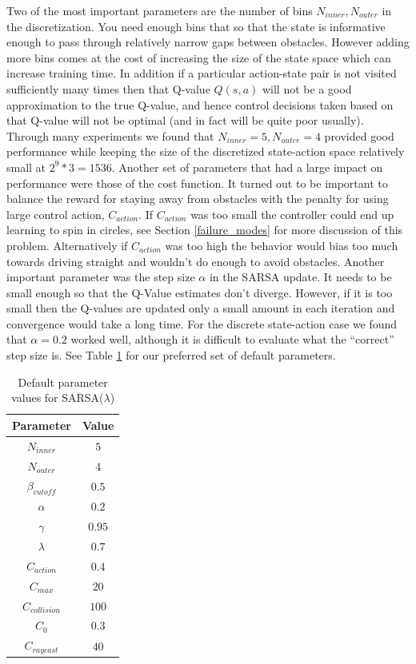 \documentclass{article}
\begin{document}
Two of the most important parameters are the number of bins $N_{inner}, N_{outer}$ in the discretization. You need enough bins that so that the state is informative enough to pass through relatively narrow gaps between obstacles. However adding more bins comes at the cost of increasing the size of the state space which can increase training time. In addition if a particular action-state pair is not visited sufficiently many times then that Q-value $Q(s,a)$ will not be a good approximation to the true Q-value, and hence control decisions taken based on that Q-value will not be optimal (and in fact will be quite poor usually). Through many experiments we found that $N_{inner} = 5, N_{outer} = 4$ provided good performance while keeping the size of the discretized state-action space relatively small at $2^9 * 3 = 1536$. Another set of parameters that had a large impact on performance were those of the cost function. It turned out to be important to balance the reward for staying away from obstacles with the penalty for using large control action, $C_{action}$. If $C_{action}$ was too small the controller could end up learning to spin in circles, see Section \ref{failure_modes} for more discussion of this problem. Alternatively if $C_{action}$ was too high the behavior would bias too much towards driving straight and wouldn't do enough to avoid obstacles. Another important parameter was the step size $\alpha$ in the SARSA update. It needs to be small enough so that the Q-Value estimates don't diverge. However, if it is too small then the Q-values are updated only a small amount in each iteration and convergence would take a long time. For the discrete state-action case we found that $\alpha = 0.2$ worked well, although it is difficult to evaluate what the ``correct'' step size is. See Table \ref{table:defaultParameters} for our preferred set of default parameters.
%
%
%
%
\begin{table}
\centering
\begin{tabular}{|c|c|}
\hline
Parameter & Value  \\ \hline
$N_{inner}$ & $5$ \\ \hline
$N_{outer}$ & $4$ \\ \hline
$\beta_{cutoff}$ & $0.5$ \\ \hline
$\alpha$ & $0.2$ \\ \hline
$\gamma$ & $0.95$ \\ \hline
$\lambda$ & $0.7$ \\ \hline
$C_{action}$ & $0.4$ \\ \hline
$C_{max}$ & $20$ \\ \hline
$C_{collision}$ & $100$ \\ \hline
$C_0$ & $0.3$ \\ \hline
$C_{raycast}$ & $40$ \\ \hline
\end{tabular}
\caption{Default parameter values for SARSA($\lambda$)}
\label{table:defaultParameters}
\end{table}
\end{document}
